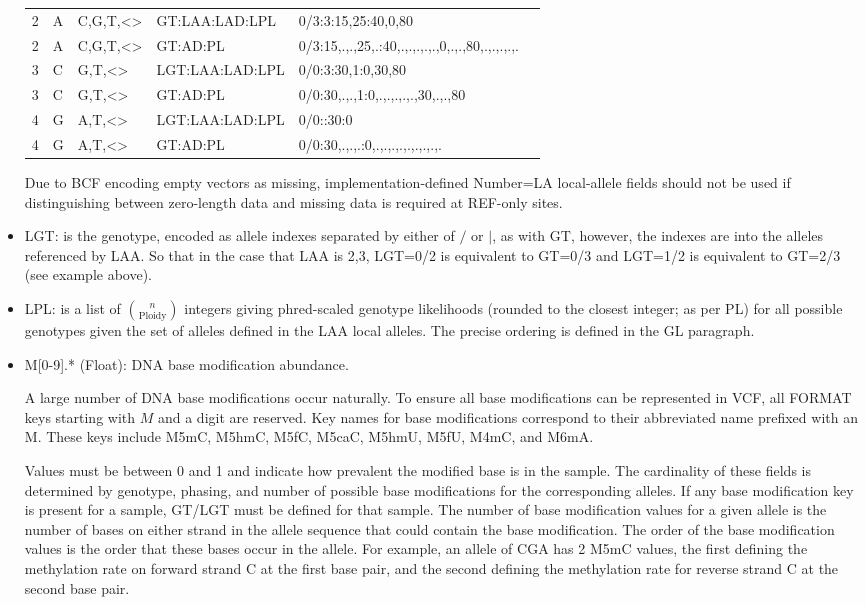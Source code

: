 \documentclass[8pt]{article}
\begin{document}
\begin{itemize}
\begin{tabular}[l]{llllll}
  	2&A&C,G,T,\textless*\textgreater& GT:LAA:LAD:LPL& 0/3:3:15,25:40,0,80\\
  	2&A&C,G,T,\textless*\textgreater& GT:AD:PL&0/3:15,.,.,25,.:40,.,.,.,.,.,0,.,.,80,.,.,.,.,.\\
  	3&C&G,T,\textless*\textgreater& LGT:LAA:LAD:LPL& 0/0:3:30,1:0,30,80\\
  	3&C&G,T,\textless*\textgreater& GT:AD:PL& 0/0:30,.,.,1:0,.,.,.,.,.,30,.,.,80\\
  	4&G&A,T,\textless*\textgreater& LGT:LAA:LAD:LPL& 0/0::30:0\\
  	4&G&A,T,\textless*\textgreater& GT:AD:PL& 0/0:30,.,.,.:0,.,.,.,.,.,.,.,.,.\\
  \end{tabular}
  Due to BCF encoding empty vectors as missing, implementation-defined Number=LA local-allele fields should not be used if distinguishing between zero-length data and missing data is required at REF-only sites.
  \item LGT: is the genotype, encoded as allele indexes separated by either of $/$ or $\mid$, as with GT, however, the indexes are into the alleles referenced by LAA.
  So that in the case that LAA is 2,3, LGT=0/2 is equivalent to GT=0/3 and LGT=1/2 is equivalent to GT=2/3 (see example above).
  \item LPL: is a list of $n \choose \mathrm{Ploidy}$ integers giving phred-scaled genotype likelihoods (rounded to the closest integer; as per PL) for all possible genotypes given the set of alleles defined in the LAA local alleles.
  The precise ordering is defined in the GL paragraph.
  
  \item M[0-9].* (Float): DNA base modification abundance.
  
  A large number of DNA base modifications occur naturally.
  To ensure all base modifications can be represented in VCF, all FORMAT keys starting with $M$ and a digit are reserved.
  Key names for base modifications correspond to their abbreviated name prefixed with an M.
  These keys include M5mC, M5hmC, M5fC, M5caC, M5hmU, M5fU, M4mC, and M6mA.
  
  Values must be between 0 and 1 and indicate how prevalent the modified base is in the sample. 
  The cardinality of these fields is determined by genotype, phasing, and number of possible base modifications for the corresponding alleles.
  If any base modification key is present for a sample, GT/LGT must be defined for that sample.
  The number of base modification values for a given allele is the number of bases on either strand in the allele sequence that could contain the base modification.
  The order of the base modification values is the order that these bases occur in the allele.
  For example, an allele of CGA has 2 M5mC values, the first defining the methylation rate on forward strand C at the first base pair, and the second defining the methylation rate for reverse strand C at the second base pair.
  

\end{itemize}
\end{document}
